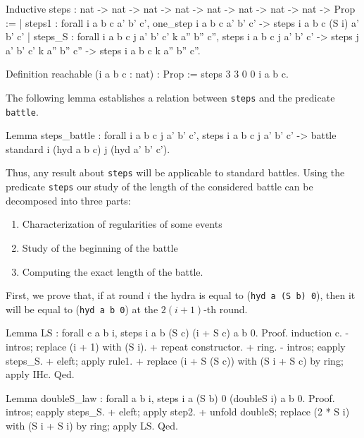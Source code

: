 \documentclass[a4paper]{book}
\begin{document}
\begin{Coqsrc}
 Inductive steps : nat -> nat -> nat -> nat ->
                  nat -> nat -> nat -> nat -> Prop :=
| steps1 : forall i a b c a' b' c',
    one_step i a b c a' b' c' -> steps i a b c (S i) a' b' c'
| steps_S : forall i a b c j a' b' c' k a'' b'' c'',
    steps i a b c j a' b' c' ->
    steps j a' b' c' k a'' b'' c'' ->
    steps i a b c k  a'' b'' c''.

Definition reachable (i a b c : nat) : Prop :=
  steps 3 3 0 0 i a b c.
\end{Coqsrc}


The following lemma establishes a relation between \texttt{steps} and the predicate \texttt{battle}.

\begin{Coqsrc}
 Lemma steps_battle : forall i a b c j a' b' c', 
   steps i a b c j a' b' c' ->
   battle standard i (hyd  a b c)   j  (hyd a' b' c').
\end{Coqsrc}

Thus, any result about \texttt{steps} will be applicable to standard battles.
Using the predicate \texttt{steps} our study of the length of the considered battle
can  be decomposed into three parts:

\begin{enumerate}
\item  Characterization of regularities of some events
\item Study of the beginning of the battle
\item Computing the exact length of the battle.
\end{enumerate}

First, we prove that, if at round $i$ the hydra is equal to
(\texttt{hyd a (S b) 0}), then it will be equal to (\texttt{hyd a b 0}) at the $2(i+1)$-th round.  

\begin{Coqsrc}
Lemma LS : forall c a b i,  steps i a b (S c) (i + S c) a b 0.
Proof.
  induction c.
 -   intros;  replace (i + 1) with (S i).
     + repeat constructor.
     + ring.
 -  intros; eapply  steps_S.
   +   eleft;   apply rule1.
   +   replace (i + S (S c)) with (S i + S c) by ring;  apply IHc.
Qed.
\end{Coqsrc}

\begin{Coqsrc}
Lemma doubleS_law : forall  a b i, steps i a (S b) 0 (doubleS i) a b 0.
Proof.
  intros;  eapply steps_S.
  +   eleft;   apply step2.
  +   unfold doubleS; replace (2 * S i) with (S i + S i) by ring; 
        apply LS.
Qed.
\end{Coqsrc}
\end{document}
